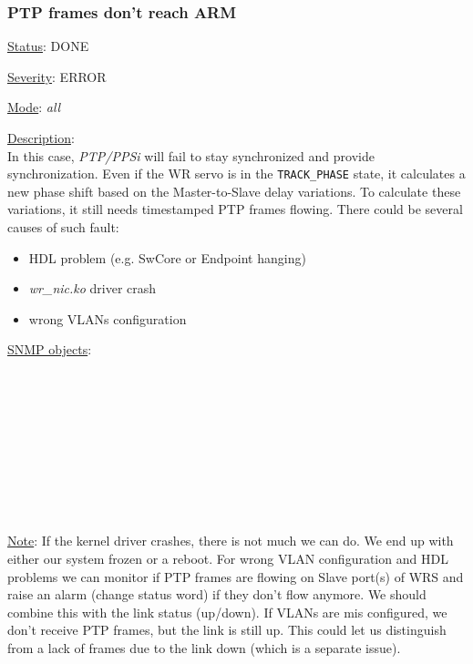 \subsubsection{\bf PTP frames don't reach ARM}
		\label{fail:timing:no_frames}
		\begin{pck_descr}
			\item [] \underline{Status}: DONE
			\item [] \underline{Severity}: ERROR
			\item [] \underline{Mode}: \emph{all}
			\item [] \underline{Description}:\\
				In this case, \emph{PTP/PPSi} will fail to stay synchronized and provide
				synchronization. Even if the WR servo is in the \texttt{TRACK\_PHASE}
				state, it calculates a new phase shift based on the Master-to-Slave delay
				variations. To calculate these variations, it still needs timestamped
				PTP frames flowing. There could be several causes of such fault:
				\begin{itemize}
					\item HDL problem (e.g. SwCore or Endpoint hanging)
					\item \emph{wr\_nic.ko} driver crash
					\item wrong VLANs configuration
				\end{itemize}
			\item [] \underline{SNMP objects}:\\
				{\footnotesize
				\\
				\\
				\\
				\\
				\\
				\\
				\\
				\\
				\\
				 }
			\item [] \underline{Note}: If the kernel driver crashes, there is not much
				we can do. We end up with either our system frozen or a reboot. For
				wrong VLAN configuration and HDL problems we can monitor if PTP frames
				are flowing on Slave port(s) of WRS and raise an alarm (change status
				word) if they don't flow anymore. We should combine this with the link
				status (up/down). If VLANs are mis configured, we don't receive PTP
				frames, but the link is still up. This could let us distinguish from a
				lack of frames due to the link down (which is a separate issue).
		\end{pck_descr}

